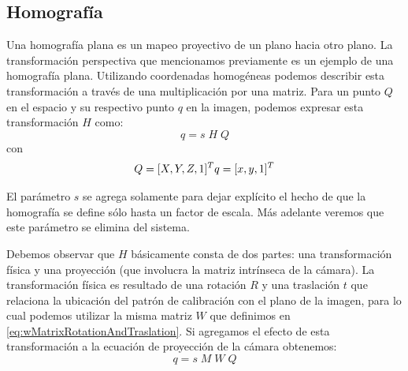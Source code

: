 \subsection{Homografía}

Una homografía plana es un mapeo proyectivo de un plano hacia otro plano. La transformación perspectiva que mencionamos previamente es un ejemplo de una homografía plana. Utilizando coordenadas homogéneas podemos describir esta transformación a través de una multiplicación por una matriz. Para un punto $Q$ en el espacio y su respectivo punto $q$ en la imagen, podemos expresar esta transformación $H$ como:
\begin{equation*}
	q = s \; H \; Q
\end{equation*}
con
\begin{equation*}
	Q = [X, Y, Z, 1]^T\\
	q = [x, y, 1]^T\\
\end{equation*}
	
El parámetro $s$ se agrega solamente para dejar explícito el hecho de que la homografía se define sólo hasta un factor de escala. Más adelante veremos que este parámetro se elimina del sistema.

Debemos observar que $H$ básicamente consta de dos partes: una transformación física y una proyección (que involucra la matriz intrínseca de la cámara). La transformación física es resultado de una rotación $R$ y una traslación $t$ que relaciona la ubicación del patrón de calibración con el plano de la imagen, para lo cual podemos utilizar la misma matriz $W$ que definimos en \eqref{eq:wMatrixRotationAndTraslation}.
Si agregamos el efecto de esta transformación a la ecuación de proyección de la cámara obtenemos:
\begin{equation}\label{eq:fullProjection}
	q = s \; M \; W \; Q
\end{equation}
	

